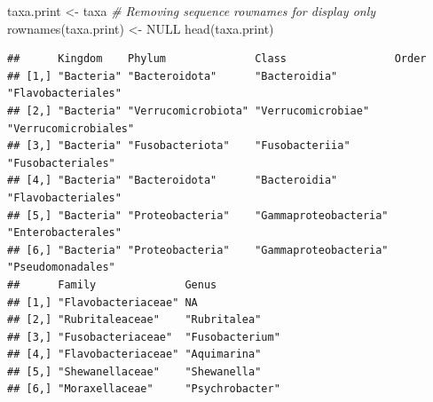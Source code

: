 \documentclass[
]{article}
\newenvironment{Shaded}{\begin{snugshade}}{\end{snugshade}}
\newcommand{\CommentTok}[1]{\textcolor[rgb]{0.56,0.35,0.01}{\textit{#1}}}
\newcommand{\ConstantTok}[1]{\textcolor[rgb]{0.00,0.00,0.00}{#1}}
\newcommand{\FunctionTok}[1]{\textcolor[rgb]{0.00,0.00,0.00}{#1}}
\newcommand{\NormalTok}[1]{#1}
\newcommand{\OtherTok}[1]{\textcolor[rgb]{0.56,0.35,0.01}{#1}}
\begin{document}
\begin{Shaded}
\begin{Highlighting}[]
\NormalTok{taxa.print }\OtherTok{\textless{}{-}}\NormalTok{ taxa }\CommentTok{\# Removing sequence rownames for display only}
\FunctionTok{rownames}\NormalTok{(taxa.print) }\OtherTok{\textless{}{-}} \ConstantTok{NULL}
\FunctionTok{head}\NormalTok{(taxa.print)}
\end{Highlighting}
\end{Shaded}

\begin{verbatim}
##      Kingdom    Phylum              Class                 Order               
## [1,] "Bacteria" "Bacteroidota"      "Bacteroidia"         "Flavobacteriales"  
## [2,] "Bacteria" "Verrucomicrobiota" "Verrucomicrobiae"    "Verrucomicrobiales"
## [3,] "Bacteria" "Fusobacteriota"    "Fusobacteriia"       "Fusobacteriales"   
## [4,] "Bacteria" "Bacteroidota"      "Bacteroidia"         "Flavobacteriales"  
## [5,] "Bacteria" "Proteobacteria"    "Gammaproteobacteria" "Enterobacterales"  
## [6,] "Bacteria" "Proteobacteria"    "Gammaproteobacteria" "Pseudomonadales"   
##      Family              Genus          
## [1,] "Flavobacteriaceae" NA             
## [2,] "Rubritaleaceae"    "Rubritalea"   
## [3,] "Fusobacteriaceae"  "Fusobacterium"
## [4,] "Flavobacteriaceae" "Aquimarina"   
## [5,] "Shewanellaceae"    "Shewanella"   
## [6,] "Moraxellaceae"     "Psychrobacter"
\end{verbatim}
\end{document}
